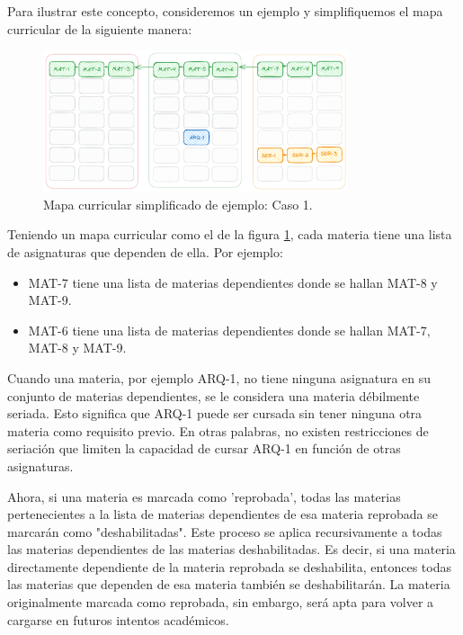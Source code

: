 Para ilustrar este concepto, consideremos un ejemplo y simplifiquemos el mapa curricular de la siguiente manera: %

\begin{figure}[h]
    \centering
    \includegraphics[width=0.8\textwidth]{images/AG-Simple-Serial-Squeme.png}
    \caption{Mapa curricular simplificado de ejemplo: Caso 1.}
    \label{fig:mapa_curricular_simplificado_caso_1}
\end{figure}

Teniendo un mapa curricular como el de la figura \ref{fig:mapa_curricular_simplificado_caso_1}, cada materia tiene una lista de asignaturas que dependen de ella. Por ejemplo: %
\begin{itemize}
    \item MAT-7 tiene una lista de materias dependientes donde se hallan MAT-8 y MAT-9.
    \item MAT-6 tiene una lista de materias dependientes donde se hallan MAT-7, MAT-8 y MAT-9.
\end{itemize}

Cuando una materia, por ejemplo ARQ-1, no tiene ninguna asignatura en su conjunto de materias dependientes, se le considera una materia débilmente seriada. Esto significa que ARQ-1 puede ser cursada sin tener ninguna otra materia como requisito previo. En otras palabras, no existen restricciones de seriación que limiten la capacidad de cursar ARQ-1 en función de otras asignaturas.

Ahora, si una materia es marcada como 'reprobada', todas las materias pertenecientes a la lista de materias dependientes de esa materia reprobada se marcarán como "deshabilitadas". Este proceso se aplica recursivamente a todas las materias dependientes de las materias deshabilitadas. Es decir, si una materia directamente dependiente de la materia reprobada se deshabilita, entonces todas las materias que dependen de esa materia también se deshabilitarán. La materia originalmente marcada como reprobada, sin embargo, será apta para volver a cargarse en futuros intentos académicos.

